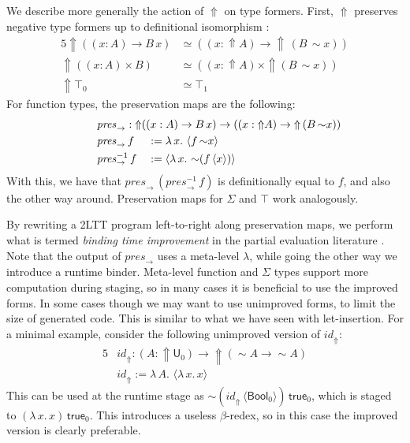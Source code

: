 \documentclass[acmsmall]{acmart}
\newcommand{\mit}[1]{\mathit{#1}}
\newcommand{\msf}[1]{\mathsf{#1}}
\newcommand{\Lift}{{\Uparrow}}
\newcommand{\spl}{{\sim}}
\newcommand{\qut}[1]{\langle #1\rangle}
\renewcommand{\U}{\msf{U}}
\newcommand{\Bool}{\msf{Bool}}
\newcommand{\true}{\msf{true}}
\theoremstyle{remark}
\begin{document}
We describe more generally the action of $\Lift$ on type formers. First, $\Lift$
preserves negative type formers up to definitional isomorphism \cite[Section~2.3]{twolevel}:
\begin{alignat*}{5}
  \Lift((x : A) \to B\,x) &\simeq ((x : \Lift A) \to \Lift\,(B\,\spl x))\\
  \Lift ((x : A) \times B) &\simeq ((x : \Lift A) \times \Lift (B\,\spl x))\\
  \Lift \top_0 &\simeq \top_1
\end{alignat*}
For function types, the preservation maps are the following:
\begin{alignat*}{5}
  & \hspace{-6em}\rlap{$\mit{pres}_\to : \Lift((x : A) \to B\,x) \to ((x : \Lift A) \to \Lift\,(B\,\spl x))$}\\
  & \hspace{-6em}\mit{pres}_\to\,f     &&:= \lambda\,x.\,\,\qut{f\,\spl x}\\
  & \hspace{-6em}\mit{pres}_\to^{-1}\,f &&:= \qut{\lambda\,x.\,\,\spl(f\,\qut{x})}
\end{alignat*}
With this, we have that $\mit{pres}_\to\,(\mit{pres}_\to^{-1}\,f)$ is
definitionally equal to $f$, and also the other way around. Preservation maps
for $\Sigma$ and $\top$ work analogously.

By rewriting a 2LTT program left-to-right along preservation maps, we perform
what is termed \emph{binding time improvement} in the partial evaluation
literature \cite[Chapter~12]{partial-evaluation}. Note that the output of $\mit{pres}_{\to}$ uses a
meta-level $\lambda$, while going the other way we introduce a runtime
binder. Meta-level function and $\Sigma$ types support more computation during
staging, so in many cases it is beneficial to use the improved forms. In some
cases though we may want to use unimproved forms, to limit the size of generated
code. This is similar to what we have seen with let-insertion. For a minimal
example, consider the following unimproved version of $\mit{id}_\Lift$:
\begin{alignat*}{5}
  & \mit{id}_\Lift : (A : \Lift \U_0) \to \Lift(\spl A \to \spl A) \\
  & \mit{id}_\Lift := \lambda\,A.\,\,\qut{\lambda\,x.\,x}
\end{alignat*}
This can be used at the runtime stage as
$\spl(\mit{id}_\Lift\,\qut{\Bool_0})\,\true_0$, which is staged to
$(\lambda\,x.\,x)\,\true_0$.  This introduces a useless $\beta$-redex, so in
this case the improved version is clearly preferable.
\end{document}
